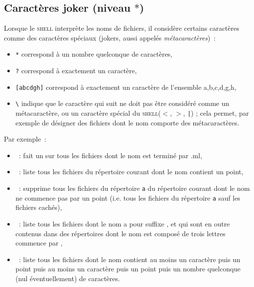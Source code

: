 \documentclass[a4paper,11pt]{article}
\newcommand{\shell}{\textsc{shell}}
\begin{document}
\subsection{Caractères joker (niveau $*$)}
Lorsque le  \shell{} interprète les noms de fichiers, il considère certains
caractères comme des caractères spéciaux (jokers, aussi appelés
\emph{métacaractères})~:

\begin{itemize}
  \item \verb|*| correspond à un nombre quelconque de caractères,
  \item \verb|?| correspond  à exactement un caractère,
  \item \verb|[abcdgh]| correspond  à exactement un caractère de
        l'ensemble {a,b,c,d,g,h},
  \item \verb|\| indique que le caractère qui suit ne doit pas être considéré
        comme un métacaractère, ou un caractère spécial du \shell ($<$, $>$,
        \verb+|+) ; cela permet, par exemple de désigner des fichiers dont le
        nom comporte des métacaractères.
 \end{itemize}

Par exemple~:

\begin{itemize}
  \item {} : fait un  sur tous les fichiers
        dont le nom est terminé par .ml,
\\  
  \item {} : liste tous les fichiers du répertoire courant dont le
        nom contient un point,
\\  
  \item {} : supprime tous les fichiers du répertoire \verb+a+ du
        répertoire courant dont le nom ne commence pas
        par un point (i.e. tous les fichiers du répertoire \verb+a+ 
        sauf les fichiers cachés),
\\  
  \item {} : liste tous les fichiers dont le nom a pour suffixe
        , et qui sont en outre contenus dans des répertoires dont le nom
        est composé de trois lettres commence par ,
\\  
  \item {} : liste tous les fichiers dont le nom contient au
        moins un caractère puis un point puis au moins un caractère puis un
        point puis un nombre quelconque (nul éventuellement) de caractères.
\end{itemize}
\end{document}
